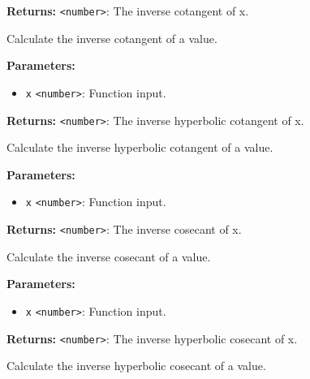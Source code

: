 \documentclass[12pt,a4paper]{article}
\begin{document}
\noindent \textbf{Returns:} \texttt{<number>}: The inverse cotangent of \textasciigrave{}x\textasciigrave{}.

\noindent Calculate the inverse cotangent of a value.

\vspace{5mm}
\noindent {}


\noindent \textbf{Parameters:}
\begin{itemize}
  \item \texttt{x} \texttt{<number>}: Function input.
\end{itemize}

\noindent \textbf{Returns:} \texttt{<number>}: The inverse hyperbolic cotangent of \textasciigrave{}x\textasciigrave{}.

\noindent Calculate the inverse hyperbolic cotangent of a value.

\vspace{5mm}
\noindent {}


\noindent \textbf{Parameters:}
\begin{itemize}
  \item \texttt{x} \texttt{<number>}: Function input.
\end{itemize}

\noindent \textbf{Returns:} \texttt{<number>}: The inverse cosecant of \textasciigrave{}x\textasciigrave{}.

\noindent Calculate the inverse cosecant of a value.

\vspace{5mm}
\noindent {}


\noindent \textbf{Parameters:}
\begin{itemize}
  \item \texttt{x} \texttt{<number>}: Function input.
\end{itemize}

\noindent \textbf{Returns:} \texttt{<number>}: The inverse hyperbolic cosecant of \textasciigrave{}x\textasciigrave{}.

\noindent Calculate the inverse hyperbolic cosecant of a value.
\end{document}

